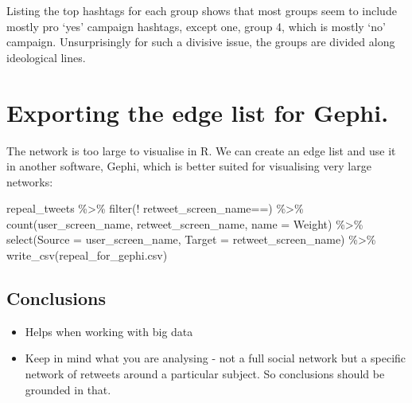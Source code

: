 \documentclass[
]{book}
\newenvironment{Shaded}{\begin{snugshade}}{\end{snugshade}}
\newcommand{\AttributeTok}[1]{\textcolor[rgb]{0.77,0.63,0.00}{#1}}
\newcommand{\FunctionTok}[1]{\textcolor[rgb]{0.00,0.00,0.00}{#1}}
\newcommand{\NormalTok}[1]{#1}
\newcommand{\SpecialCharTok}[1]{\textcolor[rgb]{0.00,0.00,0.00}{#1}}
\newcommand{\StringTok}[1]{\textcolor[rgb]{0.31,0.60,0.02}{#1}}
\begin{document}
Listing the top hashtags for each group shows that most groups seem to include mostly pro `yes' campaign hashtags, except one, group 4, which is mostly `no' campaign. Unsurprisingly for such a divisive issue, the groups are divided along ideological lines.

\hypertarget{exporting-the-edge-list-for-gephi.}{%
\section{Exporting the edge list for Gephi.}\label{exporting-the-edge-list-for-gephi.}}

The network is too large to visualise in R. We can create an edge list and use it in another software, Gephi, which is better suited for visualising very large networks:

\begin{Shaded}
\begin{Highlighting}[]
\NormalTok{repeal\_tweets }\SpecialCharTok{\%\textgreater{}\%} 
  \FunctionTok{filter}\NormalTok{(}\SpecialCharTok{!}\NormalTok{ retweet\_screen\_name}\SpecialCharTok{==}\StringTok{\textquotesingle{}\textquotesingle{}}\NormalTok{) }\SpecialCharTok{\%\textgreater{}\%} 
  \FunctionTok{count}\NormalTok{(user\_screen\_name, retweet\_screen\_name, }\AttributeTok{name =} \StringTok{\textquotesingle{}Weight\textquotesingle{}}\NormalTok{) }\SpecialCharTok{\%\textgreater{}\%} 
  \FunctionTok{select}\NormalTok{(}\AttributeTok{Source =}\NormalTok{ user\_screen\_name, }\AttributeTok{Target =}\NormalTok{ retweet\_screen\_name) }\SpecialCharTok{\%\textgreater{}\%} \FunctionTok{write\_csv}\NormalTok{(}\StringTok{\textquotesingle{}repeal\_for\_gephi.csv\textquotesingle{}}\NormalTok{)}
\end{Highlighting}
\end{Shaded}

\hypertarget{conclusions-4}{%
\subsection{Conclusions}\label{conclusions-4}}

\begin{itemize}
\item
  Helps when working with big data
\item
  Keep in mind what you are analysing - not a full social network but a specific network of retweets around a particular subject. So conclusions should be grounded in that.
\end{itemize}
\end{document}
